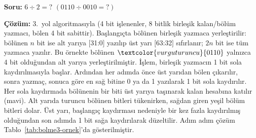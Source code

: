 \begin{ornek}[5.12]
\textbf{Soru:} $6 \div 2 = ?$ \quad $(0110 \div 0010 = ?)$

\textbf{Çözüm:} 3.\ yol algoritmasıyla (4 bit işlenenler, 8 bitlik birleşik kalan/bölüm yazmacı, bölen 4 bit sabittir). Başlangıçta bölünen birleşik yazmaca yerleştirilir: bölünen $n$ bit ise alt yarıya [31:0] yazılıp üst yarı [63:32] sıfırlanır; $2n$ bit ise tüm yazmaca yazılır. Bu örnekte bölünen $\textcolor{vurguturuncu}{0110}$ yalnızca 4 bit olduğundan alt yarıya yerleştirilmiştir. İşlem, birleşik yazmacın 1 bit sola kaydırılmasıyla başlar. Ardından her adımda önce üst yarıdan bölen çıkarılır, sonra yazmaç, sonuca göre en sağ bitine 0 ya da 1 yazılarak 1 bit sola kaydırılır. Her sola kaydırmada bölünenin bir biti üst yarıya taşınarak kalan hesabına katılır (\textcolor{vurgumavi}{mavi}). Alt yarıda \textcolor{vurguturuncu}{turuncu} bölünen bitleri tükenirken, sağdan giren \textcolor{vurguyesil}{yeşil} bölüm bitleri dolar. Üst yarı, başlangıç kaydırması nedeniyle bir kez fazla kaydırılmış olduğundan son adımda 1 bit sağa kaydırılarak düzeltilir. Adım adım çözüm Tablo~\ref{tab:bolme3-ornek}'da gösterilmiştir.


\end{ornek}
